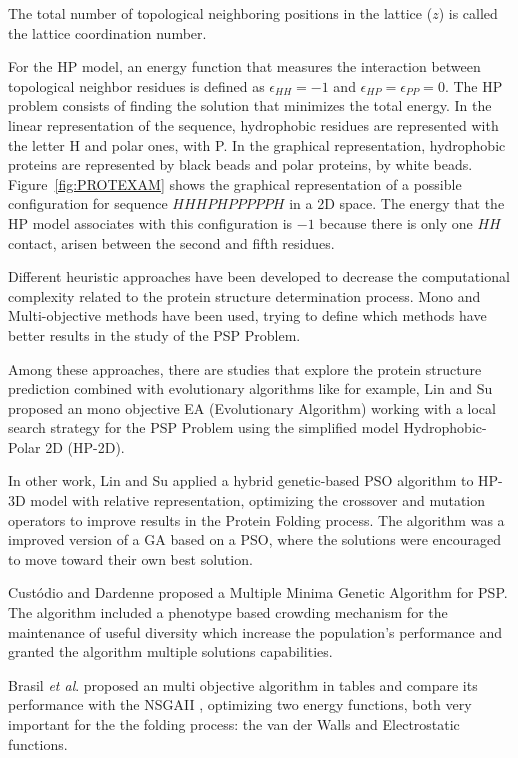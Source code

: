 The total number of topological neighboring positions in the lattice ($z$) is called the lattice coordination number.


For the HP model, an energy function that  measures the interaction between topological  neighbor residues is defined  as  $\epsilon_{HH}=-1$ and $\epsilon_{HP}=\epsilon_{PP}=0$. The HP problem consists of finding the solution that minimizes the total energy. In the linear representation of the sequence, hydrophobic residues are represented with the letter H and polar ones, with P. In the graphical representation, hydrophobic proteins are represented  by black beads and polar proteins, by white beads. Figure~\ref{fig:PROTEXAM} shows the graphical representation of a possible configuration for  sequence  $HHHPHPPPPPH$ in a 2D space. The energy that the HP model associates with this configuration is $-1$ because there is only one $HH$ contact, arisen between the second and fifth residues.


Different heuristic approaches have been developed to decrease the computational complexity related to the protein structure determination process. Mono and Multi-objective methods have been used, trying to define which methods have better results in the study of the PSP Problem.


Among these approaches, there are studies that explore the protein structure prediction combined with evolutionary algorithms like for example, Lin and Su \cite{li2012genetic} proposed an mono objective EA (Evolutionary Algorithm) working with a local search strategy for the PSP Problem using the simplified model Hydrophobic-Polar 2D (HP-2D).


In other work, Lin and Su \cite{lin2011protein} applied a hybrid genetic-based PSO algorithm to HP-3D model with relative representation, optimizing the crossover and mutation operators to improve results in the Protein Folding process. The algorithm was a improved version of a GA based on a PSO, where the solutions were encouraged to move toward their own best solution.


Cust\'{o}dio and Dardenne \cite{custodio2014multiple} proposed a Multiple Minima Genetic Algorithm for PSP. The algorithm included a phenotype based crowding mechanism for the maintenance of useful diversity which increase the population's performance and granted the algorithm multiple solutions capabilities.


Brasil \textit{et al}.\cite{soares2011investigating} proposed an multi objective algorithm in tables and compare its performance with the NSGAII \cite{deb2002fast}, optimizing two energy functions, both very important for the the folding process: the van der Walls and Electrostatic functions.

